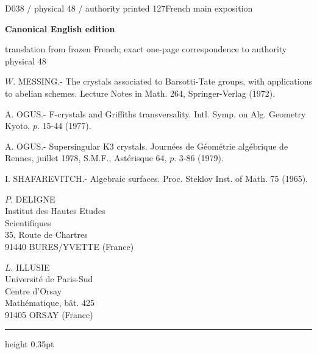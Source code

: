 \documentclass[9pt]{article}
\newcommand{\CanonText}[1]{\par{\fontsize{8.0}{9.35}\selectfont\RaggedRight #1\par}\vspace{2.2pt}}
\newcommand{\LayerTitle}{Canonical English edition}
\begin{document}
\noindent\begin{minipage}[t][\dimexpr\textheight-5pt\relax][t]{\textwidth}
{\sffamily\fontsize{7.3}{8.2}\selectfont\color{Quiet} D038 / physical 48 / authority printed 127\hfill French main exposition}
\par{}\vspace{4.5pt}
{\sffamily\fontsize{10.4}{11.6}\selectfont\bfseries\color{Accent} \LayerTitle}
\par{\sffamily\fontsize{6.7}{7.7}\selectfont\color{Quiet} translation from frozen French; exact one-page correspondence to authority physical 48}
\vspace{5pt}
\CanonText{[14] \(W\). MESSING.- The crystals associated to Barsotti-Tate groups, with applications to abelian schemes. Lecture Notes in Math. 264, Springer-Verlag (1972).}
\CanonText{[15] A. OGUS.- F-crystals and Griffiths transversality. Intl. Symp. on Alg. Geometry Kyoto, \(p\). 15-44 (1977).}
\CanonText{[16] A. OGUS.- Supersingular K3 crystals. Journées de Géométrie algébrique de Rennes, juillet 1978, S.M.F., Astérisque 64, \(p\). 3-86 (1979).}
\CanonText{[17] I. SHAFAREVITCH.- Algebraic surfaces. Proc. Steklov Inst. of Math. 75 (1965).}
\CanonText{\(P\). DELIGNE\\Institut des Hautes Etudes\\Scientifiques\\35, Route de Chartres\\91440 BURES/YVETTE (France)}
\CanonText{\(L\). ILLUSIE\\Université de Paris-Sud\\Centre d'Orsay\\Mathématique, bât. 425\\91405 ORSAY (France)}
\vfill
{\color{Accent}\hrule height 0.35pt}\vspace{3pt}
\end{minipage}
\newpage
\end{document}
